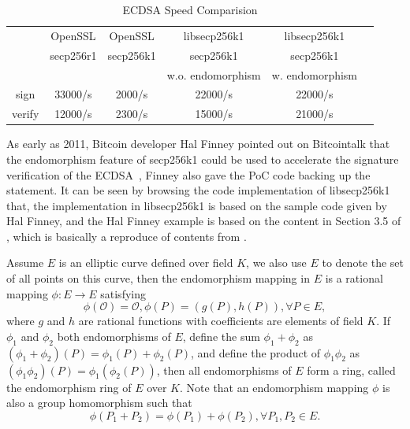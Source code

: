 \documentclass{article}
\begin{document}
\begin{table}[h]
\centering
\caption{ECDSA Speed Comparision}\label{tbl-ecdsa-bench}
\begin{tabular}{|c|c|c|c|c|c|}
\hline
\small
         & OpenSSL & OpenSSL & libsecp256k1 & libsecp256k1 \\
         & secp256r1 & secp256k1 & secp256k1  & secp256k1 \\
         &                 &                 & w.o. endomorphism & w. endomorphism \\\hline
 sign  & 33000/s  & 2000/s & 22000/s & 22000/s \\\hline
 verify & 12000/s & 2300/s & 15000/s & 21000/s \\\hline
\end{tabular}
\end{table}

As early as 2011, Bitcoin developer Hal Finney pointed out on Bitcointalk that 
the endomorphism feature of secp256k1 could be used to accelerate the signature verification of the ECDSA~\cite{halfinney}, 
Finney also gave the PoC code backing up the statement.
It can be seen by browsing the code implementation of libsecp256k1 that, 
the implementation in libsecp256k1 is based on the sample code given by Hal Finney, 
and the Hal Finney example is based on the content in Section 3.5 of \cite{guidetoecc}, 
which is basically a reproduce of contents from \cite{glv01}.

Assume $E$ is an elliptic curve defined over field $K$, we also use $E$ to denote the set of all points on this curve,
then  the endomorphism mapping in $E$ is a rational mapping $\phi: E \rightarrow E$ satisfying 
$$\phi(\mathcal{O}) = \mathcal{O}, \phi(P) = (g(P), h(P)), \forall P \in E,$$
where $g$ and $h$ are rational functions with coefficients  are elements of field $K$.
If $\phi_1$ and $\phi_2$ both endomorphisms of $E$, 
define the sum $\phi_1+\phi_2$  as $(\phi_1+\phi_2)(P) = \phi_1(P) + \phi_2(P)$,
and define the product of $\phi_1\phi_2$ as  $(\phi_1\phi_2)(P)=\phi_1(\phi_2(P))$,
then all endomorphisms of $E$ form a ring, called the endomorphism ring of $E$ over $K$.
Note that an endomorphism mapping $\phi$ is also a group homomorphism such that  
$$\phi(P_1 + P_2) = \phi(P_1) + \phi(P_2), \forall P_1, P_2 \in E.$$
 
\end{document}
